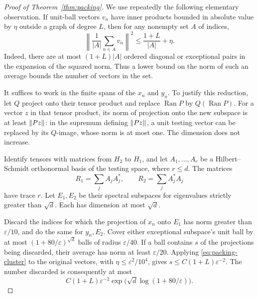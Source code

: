 \begin{proof}[Proof of Theorem~\ref{thm:packing}]
We use repeatedly the following elementary observation.  If unit-ball
vectors $v_n$ have inner products bounded in absolute value by $\eta$
outside a graph of degree $L$, then for any nonempty set $A$ of indices,
\begin{equation}\label{eq:packing-cluster}
 \left\|\frac1{|A|}\sum_{n\in A}v_n\right\|^2
                    \le\frac{1+L}{|A|}+\eta.
\end{equation}
Indeed, there are at most $(1+L)|A|$ ordered diagonal or exceptional
pairs in the expansion of the squared norm.  Thus a lower bound on the
norm of such an average bounds the number of vectors in the set.

It suffices to work in the finite spans of the $x_n$ and $y_n$.
To justify this reduction, let $Q$ project onto their tensor product
and replace $\operatorname{Ran}P$ by $Q(\operatorname{Ran}P)$.
For a vector $z$ in that tensor product, its norm of projection onto
the new subspace is at least $\lVert Pz\rVert$: in the supremum defining
$\lVert Pz\rVert$, a unit testing vector can be replaced by its $Q$-image,
whose norm is at most one.  The dimension does not increase.

Identify tensors with matrices from $H_2$ to $H_1$, and let
$A_1,\ldots,A_r$ be a Hilbert--Schmidt orthonormal basis of the testing
space, where $r\le d$.  The matrices
\[
                  R_1=\sum_jA_jA_j^*,\qquad
                  R_2=\sum_jA_j^*A_j
\]
have trace $r$.  Let $E_1,E_2$ be their spectral subspaces for eigenvalues
strictly greater than $\sqrt d$.  Each has dimension at most $\sqrt d$.

Discard the indices for which the projection of $x_n$ onto $E_1$ has
norm greater than $\varepsilon/10$, and do the same for $y_n,E_2$.
Cover either exceptional subspace's unit ball by at most
$(1+80/\varepsilon)^{\sqrt d}$ balls of radius $\varepsilon/40$.
If a ball contains $s$ of the projections being discarded, their
average has norm at least $\varepsilon/20$.  Applying
\eqref{eq:packing-cluster} to the original vectors, with
$\eta\le\varepsilon^2/10^4$, gives
$s\le C(1+L)\varepsilon^{-2}$.  The number discarded is consequently
at most
\begin{equation}\label{eq:packing-discarded}
 C(1+L)\varepsilon^{-2}
              \exp\bigl(\sqrt d\log(1+80/\varepsilon)\bigr).
\end{equation}


\end{proof}
